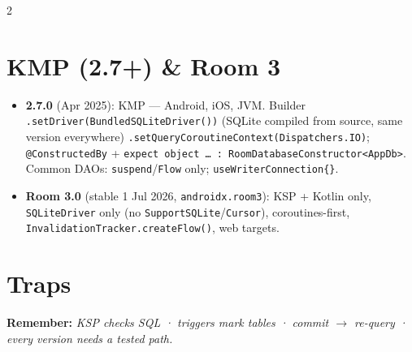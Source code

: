 \documentclass[8pt]{extarticle}
\begin{document}
\begin{multicols}{2}
\section{KMP (2.7+) \& Room 3}
\begin{itemize}\raggedright
  \item \textbf{2.7.0} (Apr 2025): KMP — Android, iOS, JVM. Builder
        \texttt{.setDriver(BundledSQLiteDriver())} (SQLite compiled from source, same version
        everywhere) \texttt{.setQueryCoroutineContext(Dispatchers.IO)};
        \texttt{@ConstructedBy} + \texttt{expect object … : RoomDatabaseConstructor<AppDb>}.
        Common DAOs: \texttt{suspend}/\texttt{Flow} only; \texttt{useWriterConnection\{\}}.
  \item \textbf{Room 3.0} (stable 1 Jul 2026, \texttt{androidx.room3}): KSP + Kotlin only,
        \texttt{SQLiteDriver} only (no \texttt{SupportSQLite}/\texttt{Cursor}), coroutines-first,
        \texttt{InvalidationTracker.createFlow()}, web targets.
\end{itemize}

\section{Traps}
\begin{itemize}\raggedright
\end{itemize}

\textbf{Remember:} \emph{KSP checks SQL · triggers mark tables · commit $\to$ re-query · every
version needs a tested path.}


\end{multicols}

\end{document}
